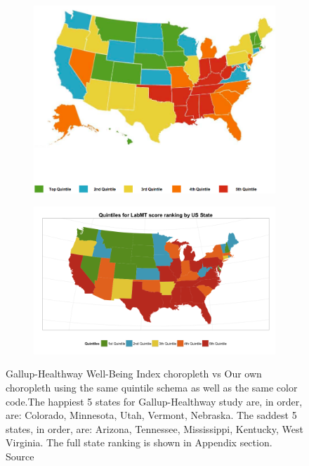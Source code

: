 \documentclass{llncs}
\begin{document}
\begin{figure}
\begin{subfigure}[b]{\textwidth}
\centering
\includegraphics[width=\textwidth]{images/gallup_2012}
\end{subfigure}
\begin{subfigure}[b]{\textwidth}
\includegraphics[width=\textwidth]{images/scores_by_state_gallup_style}
\end{subfigure}
\caption{Gallup-Healthway Well-Being Index choropleth vs Our own choropleth using the same quintile schema as well as the same color code.The happiest 5 states for Gallup-Healthway study are, in order, are: Colorado, Minnesota, Utah, Vermont, Nebraska. The saddest 5 states, in order, are: Arizona, Tennessee, Mississippi, Kentucky, West Virginia. The full state ranking is shown in Appendix section. Source \cite{GallupHealthway2013}}
\label{fig:gallup_vs_labmt}
\end{figure}
\end{document}
